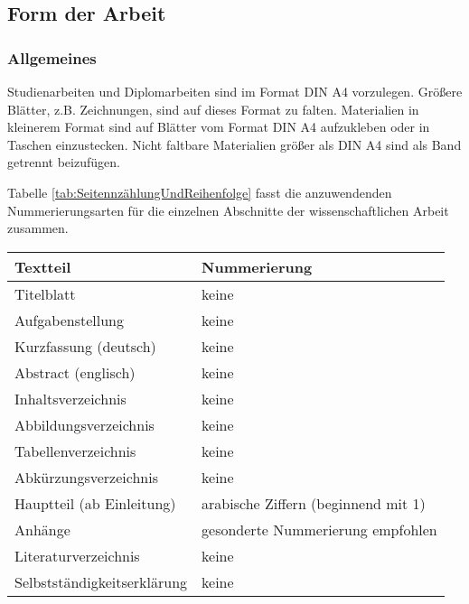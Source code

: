 \subsection{Form der Arbeit}
\label{sec:FormDerArbeit}

\subsubsection{Allgemeines}
\label{sec:Allgemeines3}

Studienarbeiten und Diplomarbeiten sind im Format DIN A4 vorzulegen. Größere Blätter, z.B. Zeichnungen, sind auf dieses Format zu falten. Materialien in kleinerem Format sind auf Blätter vom Format DIN A4 aufzukleben oder in Taschen einzustecken. Nicht faltbare Materialien größer als DIN A4 sind als Band getrennt beizufügen.

Tabelle \ref{tab:SeitennzählungUndReihenfolge} fasst die anzuwendenden Nummerierungsarten für die einzelnen Abschnitte der wissenschaftlichen Arbeit zusammen.

\begin{table*}[ht]
  \centering
    \caption{Seitenzählung und Reihenfolge}
    \label{tab:SeitennzählungUndReihenfolge}
    \begin{tabular}{ll}
      \toprule
      Textteil                      & Nummerierung \\
      \midrule
      Titelblatt                    & keine \\
       Aufgabenstellung             & keine \\
       Kurzfassung (deutsch)        & keine \\
       Abstract (englisch)          & keine \\
       Inhaltsverzeichnis           & keine \\
       Abbildungsverzeichnis        & keine \\
       Tabellenverzeichnis          & keine \\
       Abkürzungsverzeichnis        & keine \\
       Hauptteil (ab Einleitung)    &  arabische Ziffern (beginnend mit 1)\\
       Anhänge                      & gesonderte Nummerierung empfohlen \\
       Literaturverzeichnis         & keine \\
       Selbstständigkeitserklärung  & keine \\
       \bottomrule
    \end{tabular}
\end{table*}

